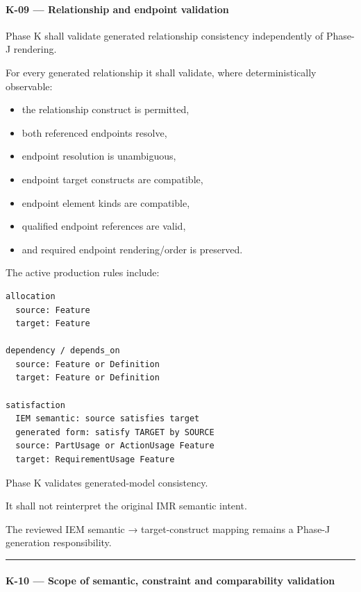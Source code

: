 \hypertarget{k-09--relationship-and-endpoint-validation}{%
\paragraph{K-09 --- Relationship and endpoint validation}\label{k-09--relationship-and-endpoint-validation}}

Phase K shall validate generated relationship consistency independently of Phase-J rendering.

For every generated relationship it shall validate, where deterministically observable:

\begin{itemize}
\tightlist
\item
  the relationship construct is permitted,
\item
  both referenced endpoints resolve,
\item
  endpoint resolution is unambiguous,
\item
  endpoint target constructs are compatible,
\item
  endpoint element kinds are compatible,
\item
  qualified endpoint references are valid,
\item
  and required endpoint rendering/order is preserved.
\end{itemize}

The active production rules include:

\begin{verbatim}
allocation
  source: Feature
  target: Feature

dependency / depends_on
  source: Feature or Definition
  target: Feature or Definition

satisfaction
  IEM semantic: source satisfies target
  generated form: satisfy TARGET by SOURCE
  source: PartUsage or ActionUsage Feature
  target: RequirementUsage Feature
\end{verbatim}

Phase K validates generated-model consistency.

It shall not reinterpret the original IMR semantic intent.

The reviewed IEM semantic → target-construct mapping remains a Phase-J generation responsibility.

\begin{center}\rule{0.5\linewidth}{0.5pt}\end{center}

\hypertarget{k-10--scope-of-semantic-constraint-and-comparability-validation}{%
\paragraph{K-10 --- Scope of semantic, constraint and comparability validation}\label{k-10--scope-of-semantic-constraint-and-comparability-validation}}

